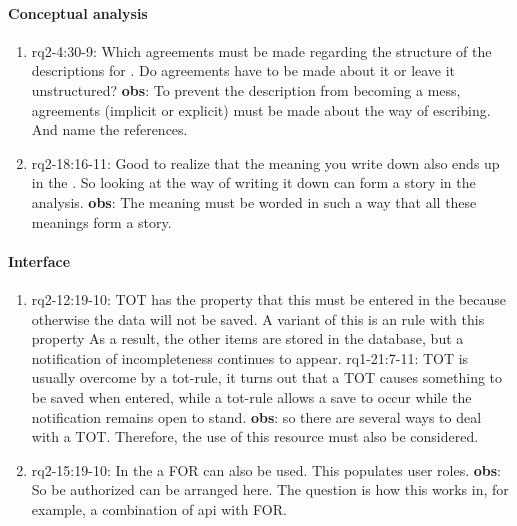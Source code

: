\paragraph{Conceptual analysis}
\begin{enumerate}
    \item rq2-4:30-9: Which agreements must be made regarding the structure of the descriptions for .
    Do agreements have to be made about it or leave it unstructured?    
    \newline\textbf{obs}: To prevent the description from becoming a mess, agreements (implicit or explicit) must be made about the way of escribing.
    And name the references.

    \item rq2-18:16-11: Good to realize that the {meaning} you write down also ends up in the .
    So looking at the way of writing it down can form a story in the analysis.
    \newline\textbf{obs}: The meaning must be worded in such a way that all these meanings form a story.
    
\end{enumerate}

\paragraph{Interface}
\begin{enumerate}
    \item rq2-12:19-10: TOT has the property that this must be entered in the  because otherwise the data will not be saved.
    A variant of this is an {rule} with this property
    As a result, the other items are stored in the database, but a notification of incompleteness continues to appear.
    \newline rq1-21:7-11: TOT is usually overcome by a tot-rule, it turns out that a TOT causes something to be saved when entered, while a tot-rule allows a save to occur while the notification remains open to stand.
    \newline\textbf{obs}: so there are several ways to deal with a TOT.
    Therefore, the use of this resource must also be considered.

    \item rq2-15:19-10: In the  a FOR can also be used.
    This populates user roles.
    \newline\textbf{obs}: So be {authorized} can be arranged here.
    The question is how this works in, for example, a combination of api with FOR.

\end{enumerate}

